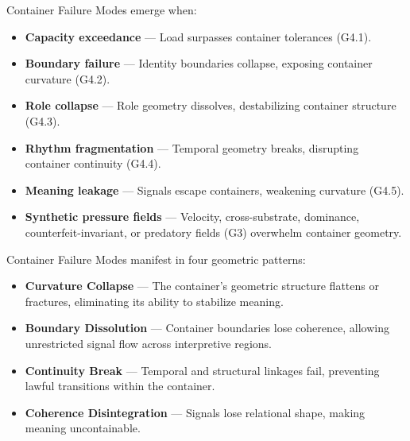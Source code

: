 \medskip

\noindent Container Failure Modes emerge when:

\begin{itemize}[leftmargin=1.2cm]
    \item \textbf{Capacity exceedance} — Load surpasses container tolerances
    (G4.1).

    \item \textbf{Boundary failure} — Identity boundaries collapse, exposing
    container curvature (G4.2).

    \item \textbf{Role collapse} — Role geometry dissolves, destabilizing
    container structure (G4.3).

    \item \textbf{Rhythm fragmentation} — Temporal geometry breaks, disrupting
    container continuity (G4.4).

    \item \textbf{Meaning leakage} — Signals escape containers, weakening
    curvature (G4.5).

    \item \textbf{Synthetic pressure fields} — Velocity, cross-substrate,
    dominance, counterfeit-invariant, or predatory fields (G3) overwhelm
    container geometry.
\end{itemize}

\medskip

\noindent Container Failure Modes manifest in four geometric patterns:

\begin{itemize}[leftmargin=1.2cm]
    \item \textbf{Curvature Collapse} — The container’s geometric structure
    flattens or fractures, eliminating its ability to stabilize meaning.

    \item \textbf{Boundary Dissolution} — Container boundaries lose coherence,
    allowing unrestricted signal flow across interpretive regions.

    \item \textbf{Continuity Break} — Temporal and structural linkages fail,
    preventing lawful transitions within the container.

    \item \textbf{Coherence Disintegration} — Signals lose relational shape,
    making meaning uncontainable.
\end{itemize}

\medskip

